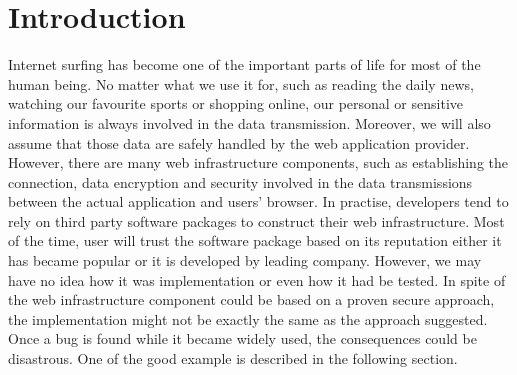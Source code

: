 
\chapter{Introduction}


Internet surfing has become one of the important parts of life for most of the human being. No matter what we use it for, such as reading the daily news, watching our favourite sports or shopping online, our personal or sensitive information is always involved in the data transmission. Moreover, we will also assume that those data are safely handled by the web application provider. However, there are many web infrastructure components, such as establishing the connection, data encryption and security involved in the data transmissions between the actual application and users' browser. In practise, developers tend to rely on third party software packages to construct their web infrastructure. Most of the time, user will trust the software package based on its reputation either it has became popular or it is developed by leading company. However, we may have no idea how it was implementation or even how it had be tested. In spite of the web infrastructure component could be based on a proven secure approach, the implementation might not be exactly the same as the approach suggested. Once a bug is found while it became widely used, the consequences could be disastrous. One of the good example is described in the following section.

